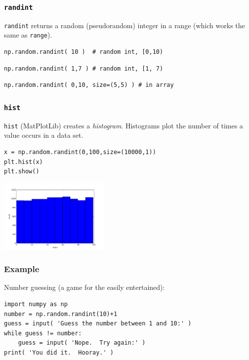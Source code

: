 \documentclass[11pt]{beamer}
\begin{document}
\begin{frame}[fragile]
  \frametitle{\texttt{randint}}
  \Enlarge

  \begin{enumerate}
  \myitem  \texttt{randint} returns a random (pseudorandom) integer in a range (which works the same as \texttt{range}).
  \end{enumerate}
  \begin{Verbatim}
np.random.randint( 10 )  # random int, [0,10)
  \end{Verbatim}
  \begin{Verbatim}
np.random.randint( 1,7 ) # random int, [1, 7)
  \end{Verbatim}
  \begin{Verbatim}
np.random.randint( 0,10, size=(5,5) ) # in array
  \end{Verbatim}
\end{frame}

\begin{frame}[fragile]
  \frametitle{\texttt{hist}}
  \Enlarge

  \begin{enumerate}
  \myitem  \texttt{hist} (MatPlotLib) creates a \emph{histogram}.
  \myitem  Histograms plot the number of times a value occurs in a data set.
  \end{enumerate}
  \begin{Verbatim}
x = np.random.randint(0,100,size=(10000,1))
plt.hist(x)
plt.show()
  \end{Verbatim}
  \includegraphics[width=0.4\textwidth]{./img/hist-randint.png}
\end{frame}

\begin{frame}[fragile]
  \frametitle{Example}
  \Enlarge

  \begin{enumerate}
  \myitem  Number guessing (a game for the easily entertained):
  \end{enumerate}
  \begin{Verbatim}
import numpy as np
number = np.random.randint(10)+1
guess = input( 'Guess the number between 1 and 10:' )
while guess != number:
    guess = input( 'Nope.  Try again:' )
print( 'You did it.  Hooray.' )
  \end{Verbatim}
\end{frame}
\end{document}
